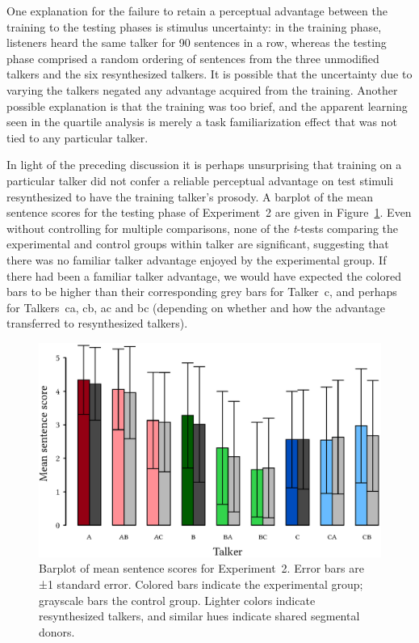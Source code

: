 One explanation for the failure to retain a perceptual advantage between the training to the testing phases is stimulus uncertainty: in the training phase, listeners heard the same talker for 90 sentences in a row, whereas the testing phase comprised a random ordering of sentences from the three unmodified talkers and the six resynthesized talkers.  It is possible that the uncertainty due to varying the talkers negated any advantage acquired from the training.  Another possible explanation is that the training was too brief, and the apparent learning seen in the quartile analysis is merely a task familiarization effect that was not tied to any particular talker.

In light of the preceding discussion it is perhaps unsurprising that training on a particular talker did not confer a reliable perceptual advantage on test stimuli resynthesized to have the training talker’s prosody.  A barplot of the mean sentence scores for the testing phase of Experiment~2 are given in Figure~\ref{fig:ExpTwoBarplot}.  Even without controlling for multiple comparisons, none of the \textit{t}-tests comparing the experimental and control groups within talker are significant, suggesting that there was no familiar talker advantage enjoyed by the experimental group.  If there had been a familiar talker advantage, we would have expected the colored bars to be higher than their corresponding grey bars for Talker~\ac{c}, and perhaps for Talkers~\ac{ca}, \ac{cb}, \ac{ac} and \ac{bc} (depending on whether and how the advantage transferred to resynthesized talkers).

\begin{figure}
	\begin{centering}
	\includegraphics{figures/results/ExpTwoBarplot.eps}
	\caption[Barplot of mean sentence scores for Experiment~2]{Barplot of mean sentence scores for Experiment~2.  Error bars are ±1 standard error.  Colored bars indicate the experimental group; grayscale bars the control group.  Lighter colors indicate resynthesized talkers, and similar hues indicate shared segmental donors.\label{fig:ExpTwoBarplot}}
	\end{centering}
\end{figure}

